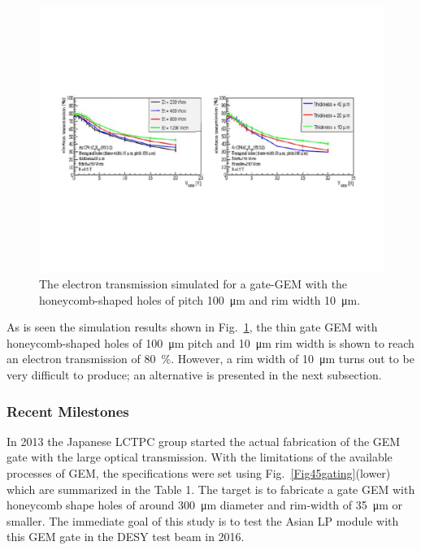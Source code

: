 \begin{figure}[htb!]
\begin{center}
\includegraphics[width=\columnwidth]{plots/TPC-Gate_Fig3gating.pdf}%
\caption{\label{Fig3gating} {The electron transmission simulated for a gate-GEM with the honeycomb-shaped holes of pitch \SI{100}{\micro\meter} and rim width \SI{10}{\micro\meter}.}}
\end{center}
\end{figure}

As is seen the simulation results shown in Fig.~\ref{Fig3gating}, the thin gate GEM with
honey\-comb-shaped holes of \SI{100}{\micro\meter} pitch and \SI{10}{\micro\meter} rim width is shown to reach
an electron transmission of \SI{80}{\percent}. However, a rim width of \SI{10}{\micro\meter} turns out to be very difficult to produce;
an alternative is presented in the next subsection.

\subsubsection{Recent Milestones}

In 2013 the Japanese LCTPC group started the actual fabrication of the GEM gate with the large
optical transmission. With the limitations of the available processes of GEM, the specifications
were set using  Fig.~\ref{Fig45gating}(lower)
which are summarized in the Table 1. The target is to fabricate a gate GEM with  honeycomb shape holes
of around \SI{300}{\micro\meter} diameter and  rim-width of \SI{35}{\micro\meter} or smaller. The immediate goal
of this study is to test the Asian LP module with this GEM gate in the DESY test beam in 2016.

